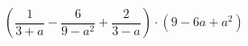 \begin{ex}[type=expression]
	\begin{condition}
		\( \left( \dfrac{1}{3+a}-\dfrac{6}{9-a^2}+\dfrac{2}{3-a} \right)\cdot(9-6a+a^2) \)
	\end{condition}
\end{ex}